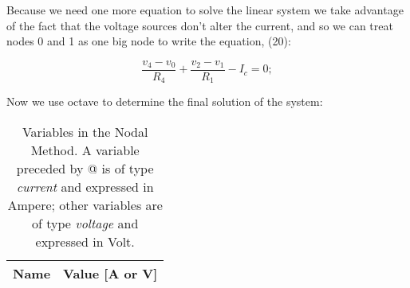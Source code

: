 Because we need one more equation to solve the linear system we take advantage of the fact that the voltage sources don't alter the current, and so we can treat nodes 0 and 1 as one big node to write the equation, (20):

\begin{equation}
  \frac{v_4-v_0}{R_4} + \frac{v_2-v_1}{R_1} - I_c = 0;
  \label{eq:BNode}
\end{equation}


Now we use octave to determine the final solution of the system:

\begin{table}[h]
  \centering
  \begin{tabular}{|l|r|}
    \hline    
    {\bf Name} & {\bf Value [A or V]} \\ \hline
    
  \end{tabular}
  \caption{Variables in the Nodal Method. A variable preceded by @ is of type {\em current} and expressed in Ampere; other variables are of type {\em voltage} and expressed in Volt.}
  \label{tab:nos}
\end{table}

\clearpage

